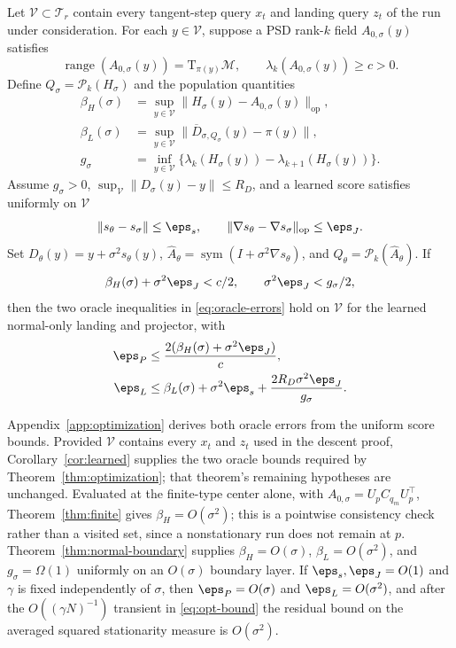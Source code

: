 \documentclass[10pt]{article}
\theoremstyle{c2fup}
\newcommand{\M}{\mathcal{M}}
\newcommand{\T}{\mathrm{T}}
\newcommand{\op}{\mathrm{op}}
\newcommand{\range}{\operatorname{range}}
\begin{document}
\begin{corollary}
\label{cor:learned}
Let $\mathcal V\subset\mathcal T_r$ contain every tangent-step query $x_t$ and landing query $z_t$ of the run under consideration.  For each $y\in\mathcal V$, suppose a PSD rank-$k$ field $A_{0,\sigma}(y)$ satisfies
\begin{equation}
  \range(A_{0,\sigma}(y))=\T_{\pi(y)}\M,
  \qquad \lambda_k(A_{0,\sigma}(y))\ge c>0.
\end{equation}
Define $Q_\sigma=\mathcal P_k(H_\sigma)$ and the population quantities
\begin{align}
  \beta_H(\sigma)&=\sup_{y\in\mathcal V}
  \|H_\sigma(y)-A_{0,\sigma}(y)\|_\op,\\
  \beta_L(\sigma)&=\sup_{y\in\mathcal V}
  \|\overline D_{\sigma,Q_\sigma}(y)-\pi(y)\|,\\
  g_\sigma&=\inf_{y\in\mathcal V}
  \{\lambda_k(H_\sigma(y))-\lambda_{k+1}(H_\sigma(y))\}.
\end{align}
Assume $g_\sigma>0$, $\sup_{\mathcal V}\|D_\sigma(y)-y\|\le R_D$, and a learned score satisfies uniformly on $\mathcal V$
\begin{equation}
  \|s_\theta-s_\sigma\|\le\eps_s,
  \qquad
  \|\nabla s_\theta-\nabla s_\sigma\|_\op\le\eps_J.
\end{equation}
Set $D_\theta(y)=y+\sigma^2s_\theta(y)$,
$\widehat A_\theta=\operatorname{sym}(I+\sigma^2\nabla s_\theta)$, and $Q_\theta=\mathcal P_k(\widehat A_\theta)$.  If
\begin{equation}
  \beta_H(\sigma)+\sigma^2\eps_J<c/2,
  \qquad \sigma^2\eps_J<g_\sigma/2,
\end{equation}
then the two oracle inequalities in \eqref{eq:oracle-errors} hold on $\mathcal V$ for the learned normal-only landing and projector, with
\begin{align}
  \eps_P&\le \frac{2(\beta_H(\sigma)+\sigma^2\eps_J)}{c},\label{eq:learned-projector}\\
  \eps_L&\le\beta_L(\sigma)+\sigma^2\eps_s
  +\frac{2R_D\sigma^2\eps_J}{g_\sigma}.
  \label{eq:learned-landing-main}
\end{align}
\end{corollary}

Appendix~\ref{app:optimization} derives both oracle errors from the uniform score
bounds.  Provided $\mathcal V$ contains every $x_t$ and $z_t$ used in the descent proof, Corollary~\ref{cor:learned} supplies the two oracle bounds required by Theorem~\ref{thm:optimization}; that theorem's remaining hypotheses are unchanged.  Evaluated at the finite-type center alone, with
$A_{0,\sigma}=U_pC_{q_m}U_p^\top$, Theorem~\ref{thm:finite} gives
$\beta_H=O(\sigma^2)$; this is a pointwise consistency check rather than a
visited set, since a nonstationary run does not remain at $p$.
Theorem~\ref{thm:normal-boundary} supplies
$\beta_H=O(\sigma)$, $\beta_L=O(\sigma^2)$, and $g_\sigma=\Omega(1)$
uniformly on an $O(\sigma)$ boundary layer.  If
$\eps_s,\eps_J=O(1)$ and $\gamma$ is fixed independently of $\sigma$, then
$\eps_P=O(\sigma)$ and $\eps_L=O(\sigma^2)$, and after the
$O((\gamma N)^{-1})$ transient in \eqref{eq:opt-bound} the residual bound on
the averaged squared stationarity measure is $O(\sigma^2)$.
\end{document}
